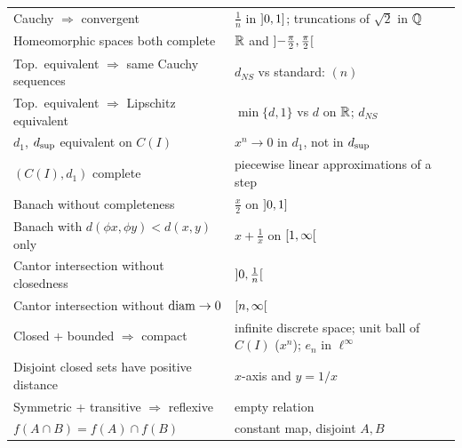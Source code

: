 \begin{center}
\begin{longtable}{@{}p{6.8cm}p{9.2cm}@{}}
Cauchy $\Rightarrow$ convergent & $\frac1n$ in $\mathopen{]}0,1\mathclose{]}$; truncations of $\sqrt2$ in $\mathbb Q$\\
Homeomorphic spaces both complete & $\mathbb R$ and $\mathopen{]}-\frac\pi2,\frac\pi2\mathclose{[}$\\
Top.\ equivalent $\Rightarrow$ same Cauchy sequences & $d_{NS}$ vs standard: $(n)$\\
Top.\ equivalent $\Rightarrow$ Lipschitz equivalent & $\min\{d,1\}$ vs $d$ on $\mathbb R$; $d_{NS}$\\
$d_1$, $d_{\sup}$ equivalent on $C(I)$ & $x^n\to0$ in $d_1$, not in $d_{\sup}$\\
$(C(I),d_1)$ complete & piecewise linear approximations of a step\\
Banach without completeness & $\frac x2$ on $\mathopen{]}0,1\mathclose{]}$\\
Banach with $d(\phi x,\phi y)<d(x,y)$ only & $x+\frac1x$ on $\mathopen{[}1,\infty\mathclose{[}$\\
Cantor intersection without closedness & $\mathopen{]}0,\frac1n\mathclose{[}$\\
Cantor intersection without $\operatorname{diam}\to0$ & $\mathopen{[}n,\infty\mathclose{[}$\\
Closed + bounded $\Rightarrow$ compact & infinite discrete space; unit ball of $C(I)$ ($x^n$); $e_n$ in $\ell^\infty$\\
Disjoint closed sets have positive distance & $x$-axis and $y=1/x$\\
Symmetric + transitive $\Rightarrow$ reflexive & empty relation\\
$f(A\cap B)=f(A)\cap f(B)$ & constant map, disjoint $A,B$\\\bottomrule
\end{longtable}
\end{center}

